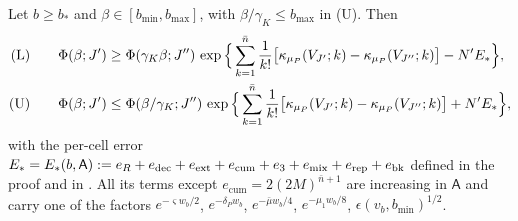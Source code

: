 \begin{lemma}\label{rot:lem:R1stg}
Let $b\ge b_*$ and $\beta\in[b_{\min},b_{\max}]$, with $\beta/\gamma_K\le b_{\max}$ in \textup{(U)}. Then
\begin{align*}
\textup{(L)}\qquad&\Phi(\beta;J')\ge\Phi(\gamma_K\beta;J'')\,\exp\Big\{\sum_{k=1}^{\bar n}\frac1{k!}\big[\kappa_{\mu_P}(V_{J'};k)-\kappa_{\mu_P}(V_{J''};k)\big]-N'E_*\Big\},\\
\textup{(U)}\qquad&\Phi(\beta;J')\le\Phi(\beta/\gamma_K;J'')\,\exp\Big\{\sum_{k=1}^{\bar n}\frac1{k!}\big[\kappa_{\mu_P}(V_{J'};k)-\kappa_{\mu_P}(V_{J''};k)\big]+N'E_*\Big\},
\end{align*}
with the per-cell error $E_*=E_*(b,\mathsf A):= e_R+e_{\mathrm{dec}}+e_{\mathrm{ext}}+e_{\mathrm{cum}}+e_3+e_{\mathrm{mix}}+e_{\mathrm{rep}}+e_{\mathrm{bk}}$ defined in the proof and in . All its terms except $e_{\mathrm{cum}}=2(2M)^{\bar n+1}$ are increasing in $\mathsf A$ and carry one of the factors $e^{-\varsigma w_b/2}$, $e^{-\delta_Pw_b}$, $e^{-\bar\mu w_b/4}$, $e^{-\mu_1w_b/8}$, $\epsilon(v_b,b_{\min})^{1/2}$.
\end{lemma}
